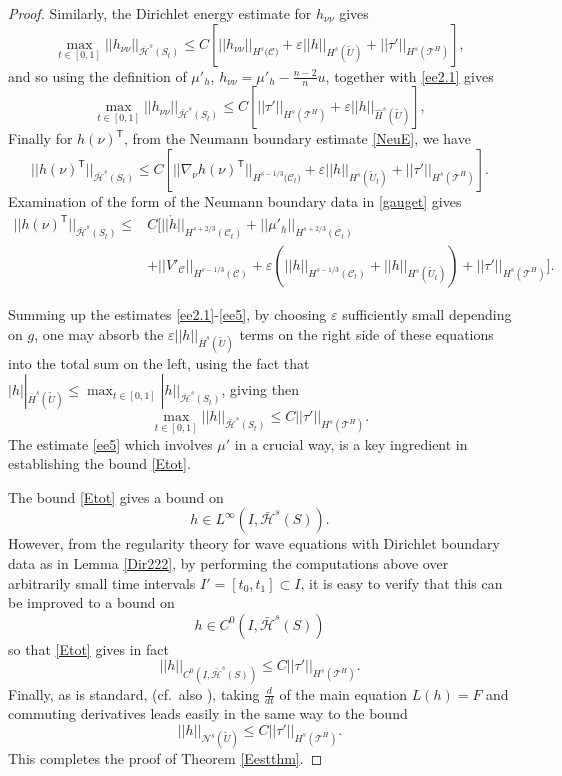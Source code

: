 \documentclass[10pt]{amsart}
\newcommand{\e}{\varepsilon}
\newcommand{\cC}{{\mathcal C}}
\newcommand{\cT}{{\mathcal T}}
\newcommand{\cN}{{\mathcal N}}
\newcommand{\cH}{{\mathcal H}}
\newcommand{\tT}{\mathsf{T}}
\newcommand{\be}{\begin{equation}}
\newcommand{\ee}{\end{equation}}
\renewcommand{\hat}{\widehat}
\newcommand{\<}{\langle}
\renewcommand{\>}{\rangle}
\newcommand{\w}{\widetilde}
\theoremstyle{plain}
\theoremstyle{remark}
\theoremstyle{definition}
\numberwithin{equation}{section}
\begin{document}
\begin{proof}
Similarly, the Dirichlet energy estimate for $h_{\nu \nu}$ gives 
$$\max_{t\in [0,1]}||h_{\nu \nu}||_{\bar \cH^s(S_t)} \leq C[ ||h_{\nu \nu}||_{H^s({\cC)}} + \e ||h||_{H^s(\w U)} + ||\tau'||_{H^s(\cT^H)} ], $$
and so using the definition of $\mu'_h$, $h_{\nu\nu} = \mu'_h - \frac{n-2}{n}u$, together with \eqref{ee2.1} gives 
\be \label{ee4}
\max_{t\in [0,1]} ||h_{\nu \nu}||_{\bar \cH^s(S_t)} \leq C[ ||\tau'||_{H^s(\cT^H)} + \e  ||h||_{\hat H^s(\w U)}],
\ee
Finally for $h(\nu)^{\tT}$, from the Neumann boundary estimate \eqref{NeuE}, we have 
$$||h(\nu)^{\tT}||_{\bar \cH^s(S_t)} \leq C[||\nabla_{\nu}h(\nu)^{\tT}||_{H^{s-1/3}({\cC_t)}} + \e ||h||_{H^{s}(\w U_t)} + ||\tau'||_{H^s(\cT^H)}  ]. $$ 
Examination of the form of the Neumann boundary data in \eqref{gauget} gives 
\be \label{ee5}
\begin{split}
||h(\nu)^{\tT}||_{\bar \cH^s(S_t)}  \leq & C[  ||\ring{h}||_{H^{s+2/3}(\cC_t)} + ||\mu'_h||_{H^{s+2/3}(\cC_t)}  \\
& + ||V'_{\cC}||_{H^{s-1/3}(\cC)} + \e(||h||_{H^{s-1/3}(\cC_t)} + ||h||_{H^{s}(\w U_t)}) + ||\tau'||_{H^s(\cT^H)} ].
\end{split}
\ee 

  
  \medskip 
 
  Summing up the estimates \eqref{ee2.1}-\eqref{ee5}, by choosing $\e$ sufficiently small depending on $g$, one may absorb 
the $\e ||h||_{\bar H^s(\w U)}$ terms on the right side of these equations into the total sum on the left, using the fact that 
$|h||_{\bar H^s(\w U)} \leq \max_{t\in [0,1]}|h||_{\bar \cH^s(S_t)}$, giving then 
\be \label{Etot}
\max_{t\in [0,1]} ||h||_{\bar \cH^s(S_t)} \leq  C ||\tau'||_{H^{s}(\cT^H)} .
\ee
The estimate \eqref{ee5} which involves $\mu'$ in a crucial way, is a key ingredient in establishing the bound \eqref{Etot}. 

 The bound \eqref{Etot} gives a bound on 
\be \label{Linf}
h \in L^{\infty}(I, \bar \cH^s(S)).
\ee
However, from the regularity theory for wave equations with Dirichlet boundary data as in Lemma \ref{Dir222}, by performing the computations 
above over arbitrarily small time intervals $I' = [t_0,t_1] \subset I$, it is easy to verify that this can be improved to a bound on 
$$h \in C^0(I, \bar \cH^s(S))$$
so that \eqref{Etot} gives in fact 
$$||h||_{C^0(I, \bar \cH^s(S))} \leq  C ||\tau'||_{H^{s}(\cT^H)}.$$ 
Finally, as is standard, (cf.~also \cite{Sa}), taking $\frac{d}{dt}$ of the main equation $L(h) = F$ and commuting derivatives leads easily in the 
same way to the bound 
\be \label{Etot2}
||h||_{\cN^s(\w U)} \leq  C ||\tau'||_{H^{s}(\cT^H)}. 
\ee
This completes the proof of Theorem \ref{Eestthm}. 

\end{proof} 
\end{document}
